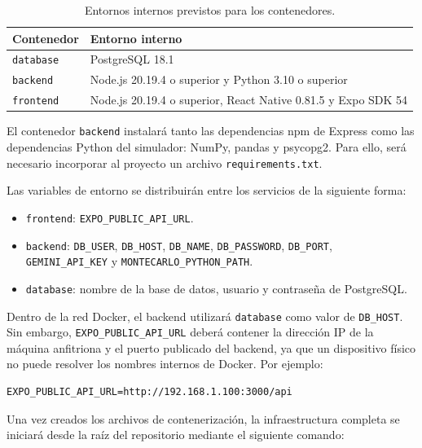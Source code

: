\begin{table}[H]
\centering
\caption{Entornos internos previstos para los contenedores.}
\label{tab:entornos-internos}
\begin{tabular}{|p{2.6cm}|p{10.7cm}|}
\hline
\textbf{Contenedor} & \textbf{Entorno interno} \\
\hline
\texttt{database} & PostgreSQL 18.1 \\
\hline
\texttt{backend} & Node.js 20.19.4 o superior y Python 3.10 o superior \\
\hline
\texttt{frontend} & Node.js 20.19.4 o superior, React Native 0.81.5 y Expo SDK 54 \\
\hline
\end{tabular}
\end{table}

El contenedor \texttt{backend} instalar\'a tanto las dependencias npm de Express
como las dependencias Python del simulador: NumPy, pandas y psycopg2. Para ello,
ser\'a necesario incorporar al proyecto un archivo \texttt{requirements.txt}.

Las variables de entorno se distribuir\'an entre los servicios de la siguiente
forma:

\begin{itemize}
  \item \texttt{frontend}: \texttt{EXPO\_PUBLIC\_API\_URL}.
  \item \texttt{backend}: \texttt{DB\_USER}, \texttt{DB\_HOST},
        \texttt{DB\_NAME}, \texttt{DB\_PASSWORD}, \texttt{DB\_PORT},
        \texttt{GEMINI\_API\_KEY} y \texttt{MONTECARLO\_PYTHON\_PATH}.
  \item \texttt{database}: nombre de la base de datos, usuario y contrase\~na de
        PostgreSQL.
\end{itemize}

Dentro de la red Docker, el backend utilizar\'a \texttt{database} como valor de
\texttt{DB\_HOST}. Sin embargo, \texttt{EXPO\_PUBLIC\_API\_URL} deber\'a contener
la direcci\'on IP de la m\'aquina anfitriona y el puerto publicado del backend, ya
que un dispositivo f\'isico no puede resolver los nombres internos de Docker. Por
ejemplo:

\begin{lstlisting}
EXPO_PUBLIC_API_URL=http://192.168.1.100:3000/api
\end{lstlisting}

Una vez creados los archivos de contenerizaci\'on, la infraestructura completa se
iniciar\'a desde la ra\'iz del repositorio mediante el siguiente comando:

